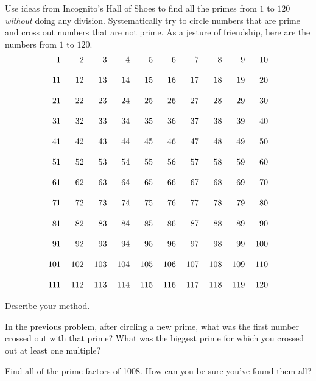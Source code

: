 \newpage


\begin{prob} 
Use ideas from Incognito's Hall of Shoes to find all the primes from $1$ to $120$ \textit{without}
doing any division.  Systematically try to circle numbers that are prime and 
cross out numbers that are not prime.  As a jesture of friendship, here are the numbers from $1$ to $120$.
\[
\begin{tabular}{r r r r r r r r r r}

  1 &   2 &   3 &   4 &   5 &   6 &   7 &   8 &   9 &  10\\
  \\
 11 &  12 &  13 &  14 &  15 &  16 &  17 &  18 &  19 &  20\\
 \\
 21 &  22 &  23 &  24 &  25 &  26 &  27 &  28 &  29 &  30\\
 \\
 31 &  32 &  33 &  34 &  35 &  36 &  37 &  38 &  39 &  40\\
 \\
 41 &  42 &  43 &  44 &  45 &  46 &  47 &  48 &  49 &  50\\
 \\
 51 &  52 &  53 &  54 &  55 &  56 &  57 &  58 &  59 &  60\\
 \\
 61 &  62 &  63 &  64 &  65 &  66 &  67 &  68 &  69 &  70\\
 \\
 71 &  72 &  73 &  74 &  75 &  76 &  77 &  78 &  79 &  80\\
 \\
 81 &  82 &  83 &  84 &  85 &  86 &  87 &  88 &  89 &  90\\
 \\
 91 &  92 &  93 &  94 &  95 &  96 &  97 &  98 &  99 & 100\\
 \\
101 & 102 & 103 & 104 & 105 & 106 & 107 & 108 & 109 & 110\\
\\
111 & 112 & 113 & 114 & 115 & 116 & 117 & 118 & 119 & 120\\
\end{tabular}
\]

Describe your method.  
\end{prob}

\begin{prob}
In the previous problem, after circling a new prime, what was the first number crossed out with that prime?  What was the biggest prime for which you crossed out at least one multiple?
\end{prob}


\begin{prob}
Find all of the prime factors of 1008. How can you be sure you've
found them all?
\end{prob}
